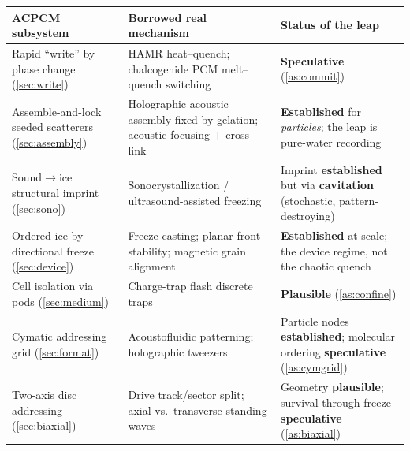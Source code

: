 \documentclass[11pt]{article}
\theoremstyle{definition}
\begin{document}
\begin{table}[t]
\centering
\small
\renewcommand{\arraystretch}{1.25}
\begin{tabularx}{\textwidth}{@{}>{\raggedright\arraybackslash}p{}
  >{\raggedright\arraybackslash}X
  >{\raggedright\arraybackslash}p{}@{}}
\toprule
\textbf{ACPCM subsystem} & \textbf{Borrowed real mechanism} & \textbf{Status of the leap} \\
\midrule
Rapid ``write'' by phase change (\cref{sec:write})
  & HAMR heat--quench; chalcogenide PCM melt--quench switching~\cite{kryder2008hamr,wuttig2007pcm}
  & \textcolor{warnrule}{\bfseries Speculative} (\cref{as:commit}) \\
Assemble-and-lock seeded scatterers (\cref{sec:assembly})
  & Holographic acoustic assembly fixed by gelation; acoustic focusing $+$ cross-link~\cite{melde2023assembly,olofsson2021hydrogel}
  & \textcolor{acpcmteal}{\bfseries Established} for \emph{particles}; the leap is pure-water recording \\
Sound$\rightarrow$ice structural imprint (\cref{sec:sono})
  & Sonocrystallization / ultrasound-assisted freezing~\cite{zhang2021uafmech,delgado2017reviewcontrol}
  & Imprint \textcolor{acpcmteal}{\bfseries established} but via \textcolor{warnrule}{\bfseries cavitation} (stochastic, pattern-destroying) \\
Ordered ice by directional freeze (\cref{sec:device})
  & Freeze-casting; planar-front stability; magnetic grain alignment~\cite{deville2006freezecast,mullins1964stability,porter2012magnetic}
  & \textcolor{acpcmteal}{\bfseries Established} at scale; the device regime, not the chaotic quench \\
Cell isolation via pods (\cref{sec:medium})
  & Charge-trap flash discrete traps~\cite{white2000sonos}
  & \textcolor{acpcmgray}{\bfseries Plausible} (\cref{as:confine}) \\
Cymatic addressing grid (\cref{sec:format})
  & Acoustofluidic patterning; holographic tweezers~\cite{rufo2022acoustofluidics,marzo2015holographic}
  & Particle nodes \textcolor{acpcmteal}{\bfseries established}; molecular ordering \textcolor{warnrule}{\bfseries speculative} (\cref{as:cymgrid}) \\
Two-axis disc addressing (\cref{sec:biaxial})
  & Drive track/sector split; axial vs.\ transverse standing waves
  & Geometry \textcolor{acpcmgray}{\bfseries plausible}; survival through freeze \textcolor{warnrule}{\bfseries speculative} (\cref{as:biaxial}) \\

\end{tabularx}
\end{table}
\end{document}
